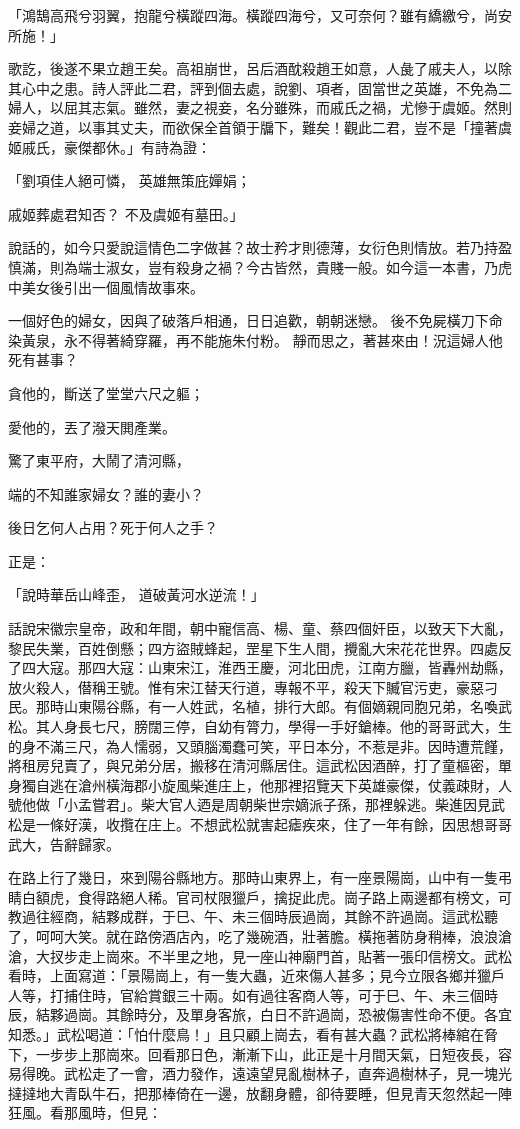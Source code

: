 \begin{showcontents}{}
「鴻鵠高飛兮羽翼，抱龍兮橫蹤四海。橫蹤四海兮，又可奈何？雖有繑繳兮，尚安所施！」

歌訖，後遂不果立趙王矣。高祖崩世，呂后酒酖殺趙王如意，人彘了戚夫人，以除其心中之患。詩人評此二君，評到個去處，說劉、項者，固當世之英雄，不免為二婦人，以屈其志氣。雖然，妻之視妾，名分雖殊，而戚氏之禍，尤慘于虞姬。然則妾婦之道，以事其丈夫，而欲保全首領于牖下，難矣！觀此二君，豈不是「撞著虞姬戚氏，豪傑都休。」有詩為證：

「劉項佳人絕可憐，  英雄無策庇嬋娟；

戚姬葬處君知否？  不及虞姬有墓田。」

說話的，如今只愛說這情色二字做甚？故士矜才則德薄，女衍色則情放。若乃持盈慎滿，則為端士淑女，豈有殺身之禍？今古皆然，貴賤一般。如今這一本書，乃虎中美女後引出一個風情故事來。

一個好色的婦女，因與了破落戶相通，日日追歡，朝朝迷戀。
後不免屍橫刀下命染黃泉，永不得著綺穿羅，再不能施朱付粉。
靜而思之，著甚來由！況這婦人他死有甚事？

貪他的，斷送了堂堂六尺之軀；

愛他的，丟了潑天閧產業。

驚了東平府，大鬧了清河縣，

端的不知誰家婦女？誰的妻小？

後日乞何人占用？死于何人之手？

正是：

「說時華岳山峰歪，  道破黃河水逆流！」

話說宋徽宗皇帝，政和年間，朝中寵信高、楊、童、蔡四個奸臣，以致天下大亂，黎民失業，百姓倒懸；四方盜賊蜂起，罡星下生人間，攪亂大宋花花世界。四處反了四大寇。那四大寇：山東宋江，淮西王慶，河北田虎，江南方臘，皆轟州劫縣，放火殺人，僣稱王號。惟有宋江替天行道，專報不平，殺天下贓官污吏，豪惡刁民。那時山東陽谷縣，有一人姓武，名植，排行大郎。有個嫡親同胞兄弟，名喚武松。其人身長七尺，膀闊三停，自幼有膂力，學得一手好鎗棒。他的哥哥武大，生的身不滿三尺，為人懦弱，又頭腦濁蠢可笑，平日本分，不惹是非。因時遭荒饉，將租房兒賣了，與兄弟分居，搬移在清河縣居住。這武松因酒醉，打了童樞密，單身獨自逃在滄州橫海郡小旋風柴進庄上，他那裡招覽天下英雄豪傑，仗義疎財，人號他做「小孟嘗君」。柴大官人迺是周朝柴世宗嫡派子孫，那裡躲逃。柴進因見武松是一條好漢，收攬在庄上。不想武松就害起瘧疾來，住了一年有餘，因思想哥哥武大，告辭歸家。

在路上行了幾日，來到陽谷縣地方。那時山東界上，有一座景陽崗，山中有一隻弔睛白額虎，食得路絕人稀。官司杖限獵戶，擒捉此虎。崗子路上兩邊都有榜文，可教過往經商，結夥成群，于巳、午、未三個時辰過崗，其餘不許過崗。這武松聽了，呵呵大笑。就在路傍酒店內，吃了幾碗酒，壯著膽。橫拖著防身稍棒，浪浪滄滄，大扠步走上崗來。不半里之地，見一座山神廟門首，貼著一張印信榜文。武松看時，上面寫道：「景陽崗上，有一隻大蟲，近來傷人甚多；見今立限各鄉并獵戶人等，打捕住時，官給賞銀三十兩。如有過往客商人等，可于巳、午、未三個時辰，結夥過崗。其餘時分，及單身客旅，白日不許過崗，恐被傷害性命不便。各宜知悉。」武松喝道：「怕什麼鳥！」且只顧上崗去，看有甚大蟲？武松將棒綰在脅下，一步步上那崗來。回看那日色，漸漸下山，此正是十月間天氣，日短夜長，容易得晚。武松走了一會，酒力發作，遠遠望見亂樹林子，直奔過樹林子，見一塊光撻撻地大青臥牛石，把那棒倚在一邊，放翻身體，卻待要睡，但見青天忽然起一陣狂風。看那風時，但見：


\end{showcontents}
